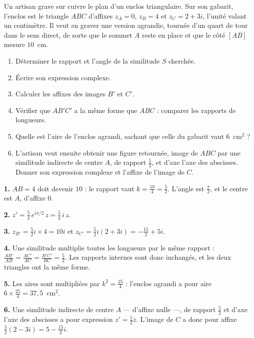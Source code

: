 \begin{jecherche}
Un artisan grave sur cuivre le plan d'un enclos triangulaire. Sur son
gabarit, l'enclos est le triangle $ABC$ d'affixes $z_{A} = 0$, $z_{B} = 4$ et
$z_{C} = 2+3i$, l'unité valant un centimètre. Il veut en graver une version
agrandie, tournée d'un quart de tour dans le sens direct, de sorte que le
sommet $A$ reste en place et que le côté $[AB]$ mesure $10$~cm.

\begin{enumerate}[label=\textbf{\arabic*.}, leftmargin=*, itemsep=0.3em]
  \item Déterminer le rapport et l'angle de la similitude $S$ cherchée.
  \item Écrire son expression complexe.
  \item Calculer les affixes des images $B'$ et $C'$.
  \item Vérifier que $A B' C'$ a la même forme que $ABC$ : comparer les
        rapports de longueurs.
  \item Quelle est l'aire de l'enclos agrandi, sachant que celle du gabarit
        vaut $6$~cm$^{2}$ ?
  \item L'artisan veut ensuite obtenir une figure retournée, image de $ABC$
        par une similitude indirecte de centre $A$, de rapport $\frac52$, et
        d'axe l'axe des abscisses. Donner son expression complexe et l'affixe
        de l'image de $C$.
\end{enumerate}
\end{jecherche}

\begin{corrige}
\textbf{1.} $AB = 4$ doit devenir $10$ : le rapport vaut
$k = \frac{10}{4} = \frac52$. L'angle est $\frac{\pi}{2}$, et le centre est
$A$, d'affixe $0$.

\textbf{2.} $z' = \frac52\,e^{i\pi/2}\,z = \frac52\,i\,z$.

\textbf{3.} $z_{B'} = \frac52 i \times 4 = 10i$ et
$z_{C'} = \frac52 i(2+3i) = -\frac{15}{2}+5i$.

\textbf{4.} Une similitude multiplie toutes les longueurs par le même
rapport : $\frac{AB'}{AB} = \frac{AC'}{AC} = \frac{B'C'}{BC} = \frac52$. Les
rapports internes sont donc inchangés, et les deux triangles ont la même
forme.

\textbf{5.} Les aires sont multipliées par $k^{2} = \frac{25}{4}$ :
l'enclos agrandi a pour aire $6 \times \frac{25}{4} = 37{,}5$~cm$^{2}$.

\textbf{6.} Une similitude indirecte de centre $A$ — d'affixe nulle —, de
rapport $\frac52$ et d'axe l'axe des abscisses a pour expression
$z' = \frac52\overline z$. L'image de $C$ a donc pour affixe
$\frac52(2-3i) = 5-\frac{15}{2}i$.
\end{corrige}

